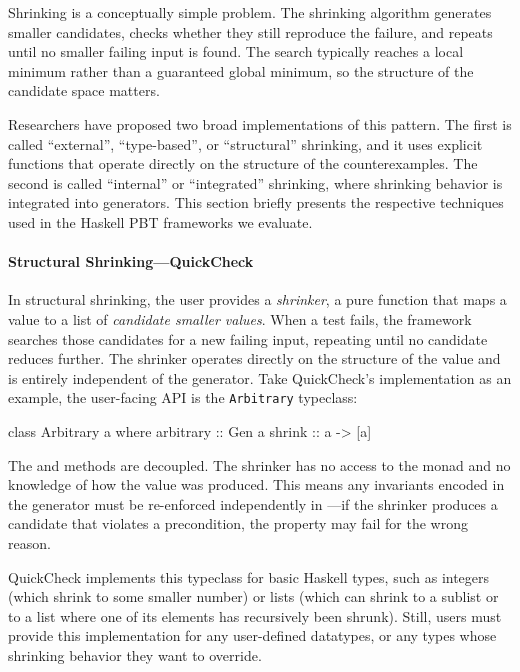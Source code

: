 Shrinking is a conceptually simple problem. The shrinking algorithm generates smaller
candidates, checks whether they still reproduce the failure, and repeats until no
smaller failing input is found. The search typically reaches a local minimum rather
than a guaranteed global minimum, so the structure of the candidate space matters.

Researchers have proposed two broad implementations of this pattern. The first is
called ``external'', ``type-based'', or ``structural'' shrinking, and it uses explicit
functions that operate directly on the structure of the counterexamples. The second is
called ``internal'' or ``integrated'' shrinking, where shrinking behavior is integrated
into generators.
%
This section briefly presents the respective techniques used in the Haskell PBT
frameworks we evaluate.

\paragraph*{Structural Shrinking---QuickCheck} \label{shrinkeval:subsec:structural}

In structural shrinking, the user provides a \emph{shrinker}, a pure function
 that maps a value to a list of \emph{candidate
  smaller values}. When a test fails, the framework searches those candidates for a new
failing input, repeating until no candidate reduces further. The shrinker operates
directly on the structure of the value and is entirely independent of the generator.
Take QuickCheck's implementation as an example, the user-facing API is the
\texttt{Arbitrary} typeclass:

\begin{code}[language=Haskell]
	class Arbitrary a where
	    arbitrary :: Gen a
	    shrink :: a -> [a]
\end{code}

\noindent The  and  methods are decoupled. The shrinker has no
access to the  monad and no knowledge of how the value was produced.
This means any invariants encoded in the generator must be re-enforced
independently in ---if the shrinker produces a candidate that
violates a precondition, the property may fail for the wrong reason.

QuickCheck implements this typeclass for basic Haskell types, such as integers (which
shrink to some smaller number) or lists (which can shrink to a sublist or to a list
where one of its elements has recursively been shrunk). Still, users must provide this
implementation for any user-defined datatypes, or any types whose shrinking behavior
they want to override.

